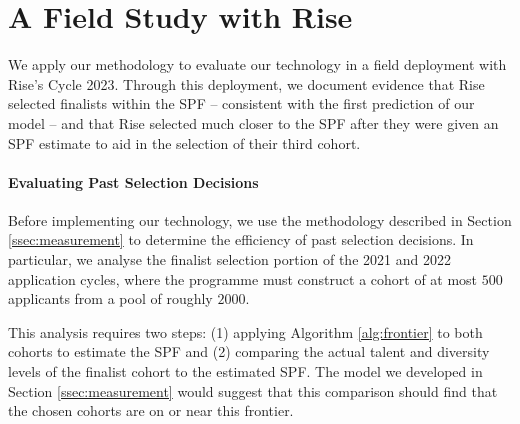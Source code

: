 \section{A Field Study with Rise}\label{sec:spfresults}

We apply our methodology to evaluate our technology in a field deployment with Rise's Cycle 2023. Through this deployment, we document evidence that Rise selected finalists within the SPF -- consistent with the first prediction of our model -- and that Rise selected much closer to the SPF after they were given an SPF estimate to aid in the selection of their third cohort.

\paragraph{Evaluating Past Selection Decisions} Before implementing our technology, we use the methodology described in Section \ref{ssec:measurement} to determine the efficiency of past selection decisions. In particular, we analyse the finalist selection portion of the 2021 and 2022 application cycles, where the programme must construct a cohort of at most $500$ applicants from a pool of roughly $2000$. 

This analysis requires two steps: (1) applying Algorithm \ref{alg:frontier} to both cohorts to estimate the SPF and (2) comparing the actual talent and diversity levels of the finalist cohort to the estimated SPF. The model we developed in Section \ref{ssec:measurement} would suggest that this comparison should find that the chosen cohorts are on or near this frontier. 

